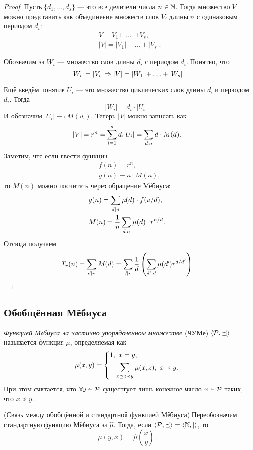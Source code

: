\begin{proof}
	Пусть $\{d_1, \ldots, d_s\}$ --- это все делители числа $n \in \mathbb{N}$. Тогда множество $V$ можно представить как объединение множеств слов $V_i$ длины $n$ с одинаковым периодом $d_i$:
	\begin{align*}
		&V = V_1 \sqcup \ldots \sqcup V_s,
		\\
		&|V| = |V_1| + \ldots + |V_s|.
	\end{align*}
	
	Обозначим за $W_i$ --- множество слов длины $d_i$ с периодом $d_i$. Понятно, что
	\[
		|W_i| = |V_i| \Rightarrow |V| = |W_1| + \ldots + |W_s|
	\]
	
	Ещё введём понятие $U_i$ --- это множество циклических слов длины $d_i$ и периодом $d_i$. Тогда
	\[
		|W_i| = d_i \cdot |U_i|.
	\]
	И обозначим $|U_i| =: M(d_i)$. Теперь $|V|$ можно записать как
	\[
		|V| = r^n = \sum\limits_{i = 1}^s d_i |U_i| = \sum\limits_{d \mid n} d \cdot M(d).
	\]
	Заметим, что если ввести функции
	\begin{align*}
		&f(n) = r^n,
		\\
		&g(n) = n \cdot M(n),
	\end{align*}
	то $M(n)$ можно посчитать через обращение Мёбиуса:
	\begin{align*}
		&g(n) = \sum\limits_{d \mid n} \mu(d) \cdot f(n / d),
		\\
		&M(n) = \frac{1}{n}\sum\limits_{d \mid n} \mu(d) \cdot r^{n / d}.
	\end{align*}
	Отсюда получаем
	\[
		T_r(n) = \sum\limits_{d \mid n} M(d) = \sum\limits_{d \mid n} \frac{1}{d} \left(\sum\limits_{d' \mid d} \mu(d') r^{d / d'}\right)
	\]
\end{proof}

\subsection{Обобщённая Мёбиуса}

\begin{definition}
	 \textit{Функцией Мёбиуса на частично упорядоченном множестве} (ЧУМе) $\langle\mathcal{P}, \preceq\rangle$ называется функция $\mu$, определяемая как
	 \[
	 	\mu(x, y) = \left\{\begin{aligned}
	 		&{1,\ x = y,}
	 		\\
	 		&{-\sum\limits_{x \preceq z \prec y} \mu(x, z),\ x \prec y.}
 		\end{aligned}\right.
	 \]
	 При этом считается, что $\forall y \in \mathcal{P}$ существует лишь конечное число $x \in \mathcal{P}$ таких, что $x \preceq y$.
\end{definition}

\begin{theorem} (Связь между обобщённой и стандартной функцией Мёбиуса)
	Переобозначим стандартную функцию Мёбиуса за $\hat{\mu}$. Тогда, если $\langle\mathcal{P}, \preceq\rangle = \langle\mathbb{N}, |\rangle$, то
	\[
		\mu(y, x) = \hat{\mu}\left(\frac{x}{y}\right).
	\]
\end{theorem}

